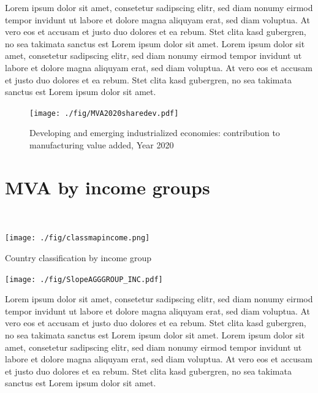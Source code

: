 \documentclass[
  openany, nofonts]{tufte-book}
\begin{document}
Lorem ipsum dolor sit amet, consetetur sadipscing elitr, sed diam nonumy eirmod tempor invidunt ut labore et dolore magna aliquyam erat, sed diam voluptua. At vero eos et accusam et justo duo dolores et ea rebum. Stet clita kasd gubergren, no sea takimata sanctus est Lorem ipsum dolor sit amet. Lorem ipsum dolor sit amet, consetetur sadipscing elitr, sed diam nonumy eirmod tempor invidunt ut labore et dolore magna aliquyam erat, sed diam voluptua. At vero eos et accusam et justo duo dolores et ea rebum. Stet clita kasd gubergren, no sea takimata sanctus est Lorem ipsum dolor sit amet.

\vspace*{\fill}

\begin{figure}
\texttt{[image: ./fig/MVA2020sharedev.pdf]} \caption[Dev. and EIE: contribution to MVA, Year 2020]{Developing and emerging industrialized economies: contribution to manufacturing value added, Year 2020}\label{fig:c03-DEVmva}
\end{figure}

\pagebreak

\hypertarget{mva-by-income-groups}{%
\section{MVA by income groups}\label{mva-by-income-groups}}

~

\begin{marginfigure}
\texttt{[image: ./fig/classmapincome.png]} \caption[Country classification by income group]{Country classification by income group}\label{fig:c03-INCmva}
\end{marginfigure}

\begin{marginfigure}
\texttt{[image: ./fig/SlopeAGGGROUP\_INC.pdf]} \end{marginfigure}

Lorem ipsum dolor sit amet, consetetur sadipscing elitr, sed diam nonumy eirmod tempor invidunt ut labore et dolore magna aliquyam erat, sed diam voluptua. At vero eos et accusam et justo duo dolores et ea rebum. Stet clita kasd gubergren, no sea takimata sanctus est Lorem ipsum dolor sit amet. Lorem ipsum dolor sit amet, consetetur sadipscing elitr, sed diam nonumy eirmod tempor invidunt ut labore et dolore magna aliquyam erat, sed diam voluptua. At vero eos et accusam et justo duo dolores et ea rebum. Stet clita kasd gubergren, no sea takimata sanctus est Lorem ipsum dolor sit amet.
\end{document}
